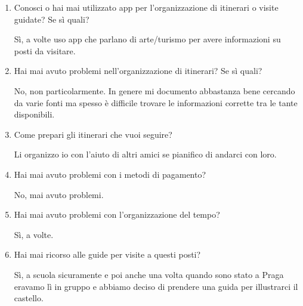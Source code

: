 \begin{enumerate}

\item Conosci o hai mai utilizzato app per l'organizzazione di itinerari o visite guidate? Se sì quali?

Sì, a volte uso app che parlano di arte/turismo per avere informazioni su posti da visitare.

\item Hai mai avuto problemi nell'organizzazione di itinerari? Se sì quali?

No, non particolarmente. In genere mi documento abbastanza bene cercando da varie fonti ma spesso è difficile trovare le informazioni corrette tra le tante disponibili.

\item Come prepari gli itinerari che vuoi seguire?

Li organizzo io con l'aiuto di altri amici se pianifico di andarci con loro.

\item Hai mai avuto problemi con i metodi di pagamento?

No, mai avuto problemi.

\item Hai mai avuto problemi con l'organizzazione del tempo?

Sì, a volte.

\item Hai mai ricorso alle guide per visite a questi posti?

Sì, a scuola sicuramente e poi anche una volta quando sono stato a Praga eravamo lì in gruppo e abbiamo deciso di prendere una guida per illustrarci il castello.

\end{enumerate}

\clearpage
{}

